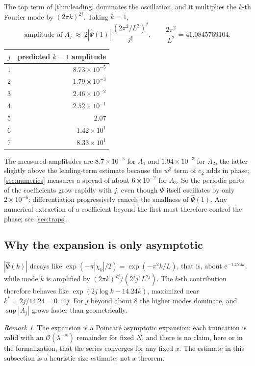 \documentclass[11pt,oneside]{article}
\theoremstyle{definition}
\theoremstyle{remark}
\newtheorem{remark}[theorem]{Remark}
\newcommand{\e}{\mathrm e}
\newcommand{\bigO}{\mathcal O}
\newcommand{\Psihat}{\widehat\Psi}
\begin{document}
The top term of \cref{thm:leading} dominates the oscillation, and it multiplies
the $k$-th Fourier mode by $(2\pi k)^{2j}$.  Taking $k=1$,
\begin{equation}\label{eq:amplitude}
  \text{amplitude of }A_j\ \approx\
  2|\Psihat(1)|\,\frac{(2\pi^2/L^2)^j}{j!},
  \qquad \frac{2\pi^2}{L^2}=41.0845769104 .
\end{equation}

\begin{center}
\begin{tabular}{@{}cr@{}}
\toprule
$j$ & predicted $k=1$ amplitude\\
\midrule
$1$ & $8.73\times10^{-5}$\\
$2$ & $1.79\times10^{-3}$\\
$3$ & $2.46\times10^{-2}$\\
$4$ & $2.52\times10^{-1}$\\
$5$ & $2.07$\\
$6$ & $1.42\times10^{1}$\\
$7$ & $8.33\times10^{1}$\\
\bottomrule
\end{tabular}
\end{center}

The measured amplitudes are $8.7\times10^{-5}$ for $A_1$ and
$1.94\times10^{-3}$ for $A_2$, the latter slightly above the leading-term
estimate because the $w^3$ term of $c_2$ adds in phase; \cref{sec:numerics}
measures a spread of about $6\times10^{-2}$ for $A_3$.  So the periodic parts of
the coefficients grow rapidly with $j$, even though $\Psi$ itself oscillates by
only $2\times10^{-6}$: differentiation progressively cancels the smallness of
$\Psihat(1)$.  Any numerical extraction of a coefficient beyond the first must
therefore control the phase; see \cref{sec:traps}.

\subsection{Why the expansion is only asymptotic}

$|\Psihat(k)|$ decays like $\exp(-\pi|\chi_k|/2)=\exp(-\pi^2k/L)$, that is,
about $\e^{-14.24k}$, while mode $k$ is amplified by
$(2\pi k)^{2j}/(2^jj!\,L^{2j})$.  The $k$-th contribution therefore behaves like
$\exp(2j\log k-14.24k)$, maximized near $k^\ast=2j/14.24=0.14j$.  For $j$ beyond
about $8$ the higher modes dominate, and $\sup|A_j|$ grows faster than
geometrically.

\begin{remark}
The expansion is a Poincar\'e asymptotic expansion: each truncation is valid
with an $\bigO(\lambda^{-N})$ remainder for fixed $N$, and there is no claim,
here or in the formalization, that the series converges for any fixed $x$.
The estimate in this subsection is a heuristic size estimate, not a theorem.
\end{remark}
\end{document}
